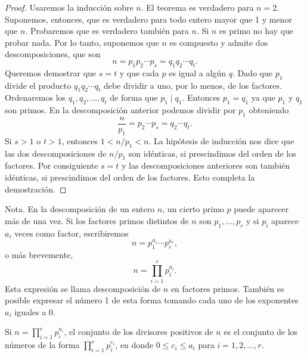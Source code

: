 \documentclass[12pt,a4paper]{book}
\begin{document}
    \begin{proof}
        Usaremos la inducción sobre $n$. El teorema es verdadero para $n=2$. Suponemos,
        entonces, que es verdadero para todo entero mayor que 1 y menor que $n$. Probaremos
        que es verdadero también para $n$. Si $n$ es primo no hay que probar nada. Por lo
        tanto, suponemos que $n$ es compuesto y admite dos descomposiciones, que son
        \begin{equation*}
            n=p_1p_2\cdots p_s=q_1q_2\cdots q_t.
        \end{equation*}
        Queremos demostrar que $s=t$ y que cada $p$ es igual a algún $q$. Dado que $p_1$
        divide el producto $q_1q_2\cdots q_t$ debe dividir a uno, por lo menos, de los
        factores. Ordenaremos los $q_1,q_2,\dots,q_t$ de forma que $p_1\mid q_1$. Entonces
        $p_1=q_1$ ya que $p_1$ y $q_1$ son primos. En la descomposición anterior podemos
        dividir por $p_1$ obteniendo
        \begin{equation*}
            \frac{n}{p_1}=p_2\cdots p_s=q_2\cdots q_t.
        \end{equation*}
        Si $s>1$ o $t>1$, entonces $1<n/p_1<n$. La hipótesis de inducción nos dice que las
        dos descomposiciones de $n/p_1$ son idénticas, si prescindimos del orden de los
        factores. Por consiguiente $s=t$ y las descomposiciones anteriores son también
        idénticas, si prescindimos del orden de los factores. Esto completa la demostración.
    \end{proof}

    Nota. En la descomposición de un entero $n$, un cierto primo $p$ puede aparecer más de
    una vez. Si los factores primos distintos de $n$ son $p_1,\dots,p_r$ y si $p_i$ aparece
    $a_i$ veces como factor, escribiremos
    \begin{equation*}
        n=p_1^{a_1}\cdots p_r^{a_r},
    \end{equation*}
    o más brevemente,
    \begin{equation*}
        n=\prod_{i=1}^{r}p_i^{a_i}.
    \end{equation*}
    Esta expresión se llama descomposición de $n$ en factores primos. También es posible
    expresar el número 1 de esta forma tomando cada uno de los exponentes $a_i$ iguales a 0.

    \begin{teorema}
        Si $n=\prod_{i=1}^{r}p_i^{a_i}$, el conjunto de los divisores positivos de $n$ es el
        conjunto de los números de la forma $\prod_{i=1}^{r}p_i^{c_i}$, en donde
        $0\leq c_i\leq a_i$ para $i=1,2,\dots,r$.
    \end{teorema}
\end{document}
